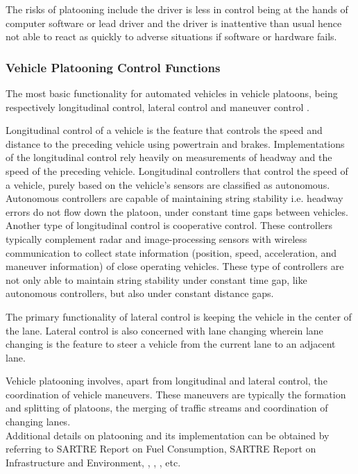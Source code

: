 The risks of platooning include the driver is less in control being at the hands of computer software or lead driver and the driver is inattentive than usual hence not able to react as quickly to adverse situations if software or hardware fails.

\subsubsection{Vehicle Platooning Control Functions}
The most basic functionality for automated vehicles in vehicle platoons, being respectively longitudinal control, lateral control and maneuver control \cite{shladover2005automated}.

Longitudinal control of a vehicle is the feature that controls the speed and distance to the preceding vehicle using powertrain and brakes. Implementations of the longitudinal control rely heavily on measurements of headway and the speed of the preceding vehicle. Longitudinal controllers that control the speed of a vehicle, purely based on the vehicle's sensors are classified as autonomous. Autonomous controllers are capable of maintaining string stability i.e. headway errors do not flow down the platoon, under constant time gaps between vehicles. Another type of longitudinal control is cooperative control. These controllers typically complement radar and image-processing sensors with wireless communication to collect state information (position, speed, acceleration, and maneuver information) of close operating vehicles. These type of controllers are not only able to maintain string stability under constant time gap, like autonomous controllers, but also under constant distance gaps.

The primary functionality of lateral control is keeping the vehicle in the center of the lane. Lateral control is also concerned with lane changing wherein lane changing is the feature to steer a vehicle from the current lane to an adjacent lane.

Vehicle platooning involves, apart from longitudinal and lateral control, the coordination of vehicle maneuvers. These maneuvers are typically the formation and splitting of platoons, the merging of traffic streams and coordination of changing lanes.\\

Additional details on platooning and its implementation can be obtained by referring to SARTRE Report on Fuel Consumption, SARTRE Report on Infrastructure and Environment, \cite{bergenhem2010challenges}, \cite{chan2012cooperative}, \cite{davila2010sartre}, etc.

